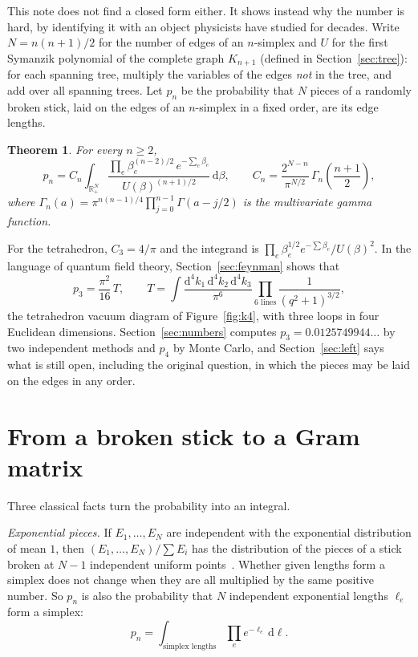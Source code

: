 \documentclass[11pt]{article}
\newtheorem{theorem}{Theorem}
\theoremstyle{remark}
\newcommand{\R}{\mathbb{R}}
\newcommand{\dd}{\mathrm{d}}
\begin{document}
This note does not find a closed form either. It shows instead why the number is hard, by identifying it
with an object physicists have studied for decades. Write $N=n(n+1)/2$ for the number of edges of an
$n$-simplex and $U$ for the first Symanzik polynomial of the complete graph $K_{n+1}$ (defined in
Section~\ref{sec:tree}): for each spanning tree, multiply the variables of the edges \emph{not} in the
tree, and add over all spanning trees. Let $p_n$ be the probability that $N$ pieces of a randomly broken
stick, laid on the edges of an $n$-simplex in a fixed order, are its edge lengths.

\begin{theorem}\label{thm:main}
For every $n\ge 2$,
\begin{equation}\label{eq:main}
p_n=C_n\int_{\R_+^N}\frac{\prod_e \beta_e^{(n-2)/2}\,e^{-\sum_e\beta_e}}{U(\beta)^{(n+1)/2}}\,\dd\beta,
\qquad C_n=\frac{2^{N-n}}{\pi^{N/2}}\,\Gamma_n\!\left(\frac{n+1}2\right),
\end{equation}
where $\Gamma_n(a)=\pi^{n(n-1)/4}\prod_{j=0}^{n-1}\Gamma(a-j/2)$ is the multivariate gamma function.
\end{theorem}

For the tetrahedron, $C_3=4/\pi$ and the integrand is $\prod_e\beta_e^{1/2}e^{-\sum\beta_e}/U(\beta)^2$. In
the language of quantum field theory, Section~\ref{sec:feynman} shows that
\[
p_3=\frac{\pi^2}{16}\,T,\qquad
T=\int\frac{\dd^4k_1\,\dd^4k_2\,\dd^4k_3}{\pi^6}\prod_{\text{6 lines}}\frac1{(q^2+1)^{3/2}},
\]
the tetrahedron vacuum diagram of Figure~\ref{fig:k4}, with three loops in four Euclidean dimensions.
Section~\ref{sec:numbers} computes $p_3=0.0125749944\ldots$ by two independent methods and $p_4$ by Monte
Carlo, and Section~\ref{sec:left} says what is still open, including the original question, in which the
pieces may be laid on the edges in any order.

\section{From a broken stick to a Gram matrix}\label{sec:gram}

Three classical facts turn the probability into an integral.

\emph{Exponential pieces.} If $E_1,\dots,E_N$ are independent with the exponential distribution of mean
$1$, then $(E_1,\dots,E_N)/\sum E_i$ has the distribution of the pieces of a stick broken at $N-1$
independent uniform points~\cite[Chapter~V, Theorem~2.2]{Dev86}. Whether given lengths form a simplex does
not change when they are all multiplied by the same positive number. So $p_n$ is also the probability
that $N$ independent exponential lengths $\ell_e$ form a simplex:
\[
p_n=\int_{\text{simplex lengths}}\prod_e e^{-\ell_e}\,\dd\ell .
\]
\end{document}
